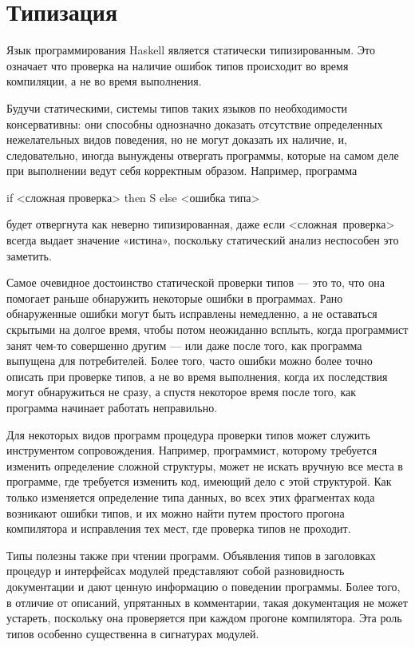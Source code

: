 \chapter{Типизация}

Язык программирования Haskell является статически типизированным. Это
означает что проверка на наличие ошибок типов происходит во время
компиляции, а не во время выполнения.

Будучи статическими, системы типов таких языков по необходимости
консервативны: они способны однозначно доказать отсутствие
определенных нежелательных видов поведения, но не могут доказать их
наличие, и, следовательно, иногда вынуждены отвергать программы,
которые на самом деле при выполнении ведут себя корректным
образом. Например, программа

\begin{code} if <сложная проверка> then S else <ошибка типа> \end{code}
будет отвергнута как неверно типизированная, даже если
<сложная~проверка> всегда выдает значение «истина», поскольку
статический анализ неспособен это заметить.

Самое очевидное достоинство статической проверки типов — это то, что
она помогает раньше обнаружить некоторые ошибки в программах. Рано
обнаруженные ошибки могут быть исправлены немедленно, а не оставаться
скрытыми на долгое время, чтобы потом неожиданно всплыть, когда
программист занят чем-то совершенно другим — или даже после того, как
программа выпущена для потребителей. Более того, часто ошибки можно
более точно описать при проверке типов, а не во время выполнения,
когда их последствия могут обнаружиться не сразу, а спустя некоторое
время после того, как программа начинает работать неправильно.

Для некоторых видов программ процедура проверки типов может служить
инструментом сопровождения. Например, программист, которому требуется
изменить определение сложной структуры, может не искать вручную все
места в программе, где требуется изменить код, имеющий дело с этой
структурой. Как только изменяется определение типа данных, во всех
этих фрагментах кода возникают ошибки типов, и их можно найти путем
простого прогона компилятора и исправления тех мест, где проверка
типов не проходит.

Типы полезны также при чтении программ. Объявления типов в заголовках
процедур и интерфейсах модулей представляют собой разновидность
документации и дают ценную информацию о поведении программы. Более
того, в отличие от описаний, упрятанных в комментарии, такая
документация не может устареть, поскольку она проверяется при каждом
прогоне компилятора. Эта роль типов особенно существенна в сигнатурах
модулей.


